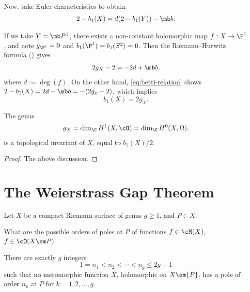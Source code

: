 \documentclass[11pt]{report}
\begin{document}
Now, take Euler characteristics to obtain
\begin{equation} \label{eq:betti-relation}
    2- b_1(X)=d(2-b_1(Y))-\mb b.
\end{equation}

If we take $Y = \mb P^1$, there exists a non-constant holomorphic map $f:X \to \P^1$, and note $g_{\P^1}=0$ and $b_1(\P^1)=b_1(S^2)=0$. Then the Riemann--Hurwitz formula () gives
\[
2g_{X}-2=-2d+\mb b,
\]
where $d:=\deg (f)$. On the other hand, \eqref{eq:betti-relation} shows $2-b_1(X)=2d-\mb b=-(2g_x-2)$, which implies
\[
b_1(X)=2g_X.
\]
\begin{thm}
The genus
\[
g_X=\dim_\C H^1(X,\cO) = \dim_\C H^0(X,\Omega),
\]
is a topological invariant of $X$, equal to $b_1(X)/2$.
\end{thm}
\begin{proof}
The above discussion.
\end{proof}

\section{The Weierstrass Gap Theorem}

Let $X$ be a compact Riemann surface of genus $g \geq 1$, and $P \in X$.
\begin{que}
What are the possible orders of poles at $P$ of functions $f \in \cM(X)$, $f \in \cO(X\sm P)$.
\end{que}

\begin{thm}
There are exactly $g$ integers
\[
1 = n_1 < n_2 <\cdots < n_g \leq 2g-1
\]
such that no meromorphic function $X$, holomorphic on $X \sm \{P\}$, has a pole of order $n_k$ at $P$ for $k = 1,2,\dots,g$.
\end{thm}
\end{document}
